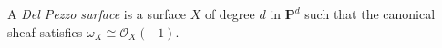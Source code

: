 A \textit{Del Pezzo surface} is a surface $X$ of degree $d$ in $\mathbf{P}^d$ such that the canonical sheaf satisfies $\omega_X \cong \mathcal{O}_X(-1)$.
